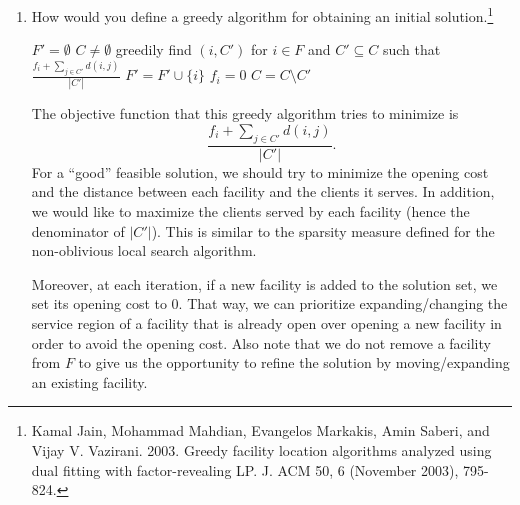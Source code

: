 \documentclass[11pt]{article}
\begin{document}
\begin{enumerate}[leftmargin=16pt]
\begin{enumerate}
        \item How would you define a greedy algorithm for obtaining an initial solution.\footnote{Kamal Jain, Mohammad Mahdian, Evangelos Markakis, Amin Saberi, and Vijay V. Vazirani. 2003. Greedy facility location algorithms analyzed using dual fitting with factor-revealing LP. J. ACM 50, 6 (November 2003), 795-824.
        }
        
        \begin{codebox}
            \li $F' = \emptyset$ 
            \li \While $C \neq \emptyset$ \Do
                \li greedily find $(i,C')$ for $i \in F$ and $C' \subseteq C$ such that $\frac{f_i + \sum_{j \in C'} d(i,j)}{|C'|}$
                \li $F' = F' \cup \{i\}$
                \li $f_i = 0$
                \li $C = C \setminus C'$  
        \end{codebox}

        The objective function that this greedy algorithm tries to minimize is
        $$
        \frac{f_i + \sum_{j \in C'} d(i,j)}{|C'|}.
        $$
        For a ``good'' feasible solution, we should try to minimize the opening cost and the distance between each facility and the clients it serves. In addition, we would like to maximize the clients served by each facility (hence the denominator of $|C'|$). This is similar to the sparsity measure defined for the non-oblivious local search algorithm.

        Moreover, at each iteration, if a new facility is added to the solution set, we set its opening cost to 0. That way, we can prioritize expanding/changing the service region of a facility that is already open over opening a new facility in order to avoid the opening cost. Also note that we do not remove a facility from $F$ to give us the opportunity to refine the solution by moving/expanding an existing facility.
    \end{enumerate}
\end{enumerate}
\end{document}
